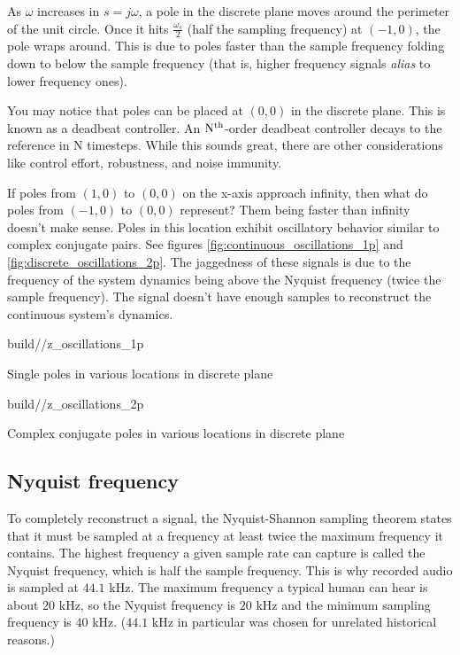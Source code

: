 As $\omega$ increases in $s = j\omega$, a pole in the discrete plane moves
around the perimeter of the unit circle. Once it hits $\frac{\omega_s}{2}$ (half
the sampling frequency) at $(-1, 0)$, the pole wraps around. This is due to
poles faster than the sample frequency folding down to below the sample
frequency (that is, higher frequency signals \textit{alias} to lower frequency
ones).

You may notice that poles can be placed at $(0, 0)$ in the discrete plane. This
is known as a deadbeat controller. An $\rm N^{th}$-order deadbeat controller
decays to the \gls{reference} in N timesteps. While this sounds great, there are
other considerations like \gls{control effort}, \gls{robustness}, and
\gls{noise immunity}.

If poles from $(1, 0)$ to $(0, 0)$ on the x-axis approach infinity, then what do
poles from $(-1, 0)$ to $(0, 0)$ represent? Them being faster than infinity
doesn't make sense. Poles in this location exhibit oscillatory behavior similar
to complex conjugate pairs. See figures \ref{fig:continuous_oscillations_1p} and
\ref{fig:discrete_oscillations_2p}. The jaggedness of these signals is due to
the frequency of the \gls{system} dynamics being above the Nyquist frequency
(twice the sample frequency). The  signal
doesn't have enough samples to reconstruct the continuous \gls{system}'s
dynamics.
\begin{bookfigure}
  \begin{minisvg}{2}{build/\chapterpath/z_oscillations_1p}
    \caption{Single poles in various locations in discrete plane}
    \label{fig:continuous_oscillations_1p}
  \end{minisvg}
  \hfill
  \begin{minisvg}{2}{build/\chapterpath/z_oscillations_2p}
    \caption{Complex conjugate poles in various locations in discrete plane}
    \label{fig:discrete_oscillations_2p}
  \end{minisvg}
\end{bookfigure}

\subsection{Nyquist frequency}

To completely reconstruct a signal, the Nyquist-Shannon sampling theorem states
that it must be sampled at a frequency at least twice the maximum frequency it
contains. The highest frequency a given sample rate can capture is called the
Nyquist frequency, which is half the sample frequency. This is why recorded
audio is sampled at $44.1$ kHz. The maximum frequency a typical human can hear
is about $20$ kHz, so the Nyquist frequency is $20$ kHz and the minimum sampling
frequency is $40$ kHz. ($44.1$ kHz in particular was chosen for unrelated
historical reasons.)

